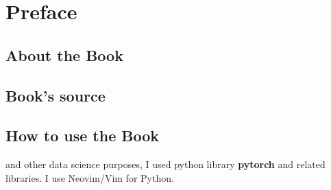 \chapter*{Preface}

\section*{About the Book}




\section*{Book's source}

\section*{How to use the Book}
 and other data science purposes, I used python library \textbf{pytorch} and related libraries. I use Neovim/Vim for Python.

